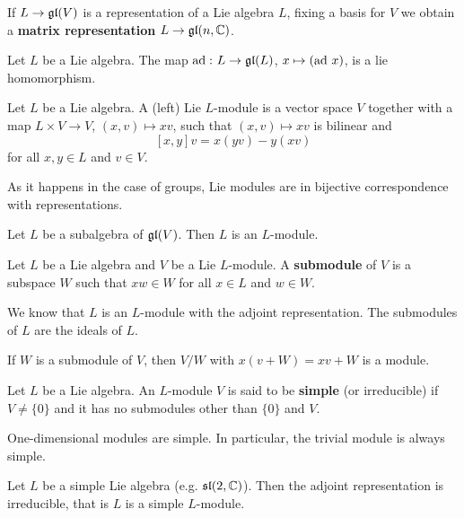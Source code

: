 If $L\to\mathfrak{gl}(V)$ is a representation of a Lie algebra $L$, 
fixing a basis for $V$ 
we obtain a \textbf{matrix representation}
$L\to\mathfrak{gl}(n,\mathbb{C})$. 

\begin{example}
    Let $L$ be a Lie algebra. 
    The map $\operatorname{ad}\,\colon L\to\mathfrak{gl}(L)$, $x\mapsto (\operatorname{ad}\,x)$, is a lie 
    homomorphism. 
\end{example}

\begin{definition}
Let $L$ be a Lie algebra. 
A (left) Lie $L$-module is a vector space $V$ 
together with a map $L\times V\to V$, $(x,v)\mapsto xv$, 
such that $(x,v)\mapsto xv$ is bilinear 
and 
\[
    [x,y]v=x(yv)-y(xv)
\]
for all $x,y\in L$ and $v\in V$. 
\end{definition}

As it happens in the case of groups, Lie modules are
in bijective correspondence with representations. 

\begin{example}
    Let $L$ be a subalgebra of $\mathfrak{gl}(V)$. Then 
    $L$ is an $L$-module. 
\end{example}

\begin{definition}
    Let $L$ be a Lie algebra and $V$ be a Lie $L$-module. 
    A \textbf{submodule} of $V$ is a subspace $W$ 
    such that $xw\in W$ for all $x\in L$ and $w\in W$. 
\end{definition}

\begin{example}
We know that $L$ is an $L$-module 
with the adjoint representation. The submodules of $L$ are
the ideals of $L$. 
\end{example}

If $W$ is a submodule of $V$, then $V/W$ 
with $x(v+W)=xv+W$ is a module. 

\begin{definition}
    Let $L$ be a Lie algebra. An $L$-module $V$ 
    is said to be \textbf{simple} (or irreducible) 
    if $V\ne \{0\}$ and it has no submodules other than $\{0\}$ and $V$. 
\end{definition}

One-dimensional modules are simple. In particular, 
the trivial module is always simple. 

\begin{example}
    Let $L$ be a simple Lie algebra (e.g. $\mathfrak{sl}(2,\mathbb{C})$). Then 
    the adjoint representation is irreducible, that is $L$ is a simple $L$-module.  
\end{example}

